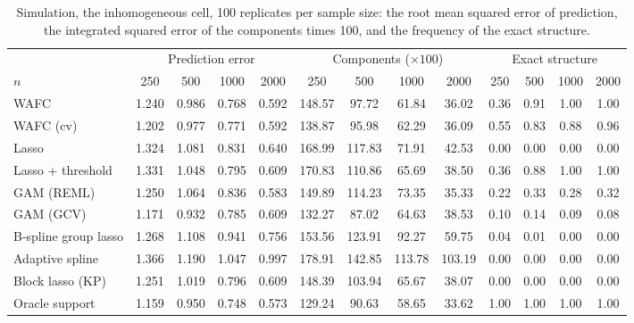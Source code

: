 \begin{table}[tp]
\caption{Simulation, the inhomogeneous cell, 100 replicates per sample size: the root mean squared error of prediction, the integrated squared error of the components times 100, and the frequency of the exact structure.}
\label{tab:sim-sizes-inhomogeneous}
\centering
\footnotesize
\setlength{\tabcolsep}{3pt}
\begin{tabular}{l cccc cccc cccc}
\hline
 & \multicolumn{4}{c}{Prediction error} & \multicolumn{4}{c}{Components ($\times 100$)} & \multicolumn{4}{c}{Exact structure} \\
$n$ & 250 & 500 & 1000 & 2000 & 250 & 500 & 1000 & 2000 & 250 & 500 & 1000 & 2000 \\
\hline
WAFC & 1.240 & 0.986 & 0.768 & 0.592 & 148.57 & 97.72 & 61.84 & 36.02 & 0.36 & 0.91 & 1.00 & 1.00 \\
WAFC (cv) & 1.202 & 0.977 & 0.771 & 0.592 & 138.87 & 95.98 & 62.29 & 36.09 & 0.55 & 0.83 & 0.88 & 0.96 \\
Lasso & 1.324 & 1.081 & 0.831 & 0.640 & 168.99 & 117.83 & 71.91 & 42.53 & 0.00 & 0.00 & 0.00 & 0.00 \\
Lasso + threshold & 1.331 & 1.048 & 0.795 & 0.609 & 170.83 & 110.86 & 65.69 & 38.50 & 0.36 & 0.88 & 1.00 & 1.00 \\
GAM (REML) & 1.250 & 1.064 & 0.836 & 0.583 & 149.89 & 114.23 & 73.35 & 35.33 & 0.22 & 0.33 & 0.28 & 0.32 \\
GAM (GCV) & 1.171 & 0.932 & 0.785 & 0.609 & 132.27 & 87.02 & 64.63 & 38.53 & 0.10 & 0.14 & 0.09 & 0.08 \\
B-spline group lasso & 1.268 & 1.108 & 0.941 & 0.756 & 153.56 & 123.91 & 92.27 & 59.75 & 0.04 & 0.01 & 0.00 & 0.00 \\
Adaptive spline & 1.366 & 1.190 & 1.047 & 0.997 & 178.91 & 142.85 & 113.78 & 103.19 & 0.00 & 0.00 & 0.00 & 0.00 \\
Block lasso (KP) & 1.251 & 1.019 & 0.796 & 0.609 & 148.39 & 103.94 & 65.67 & 38.07 & 0.00 & 0.00 & 0.00 & 0.00 \\
Oracle support & 1.159 & 0.950 & 0.748 & 0.573 & 129.24 & 90.63 & 58.65 & 33.62 & 1.00 & 1.00 & 1.00 & 1.00 \\
\hline
\end{tabular}
\end{table}

